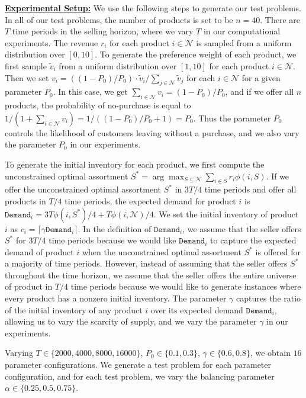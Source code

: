 \documentclass[mnsc,non-blindrev]{informs3}
\theoremstyle{definition}
\begin{document}
\begin{appendices}{\Large{}}
{\noindent\underline{\bf Experimental Setup:} We use the following steps to generate our test problems. In all of our test problems, the number of products is set to be $n=40$. There are $T$ time periods in the selling horizon, where we vary $T$ in our computational experiments. The revenue $r_i$ for each product $i\in\mathcal{N}$ is sampled from a uniform distribution over $[0,10]$. To generate the preference weight of each product, we first sample $\tilde{v}_i$ from a uniform distribution over $[1,10]$ for each product $i\in\mathcal{N}$. Then we set $v_i=({(1-P_0)}/{P_0})\cdot\tilde{v}_i/\sum_{j\in\mathcal{N}}\tilde{v}_j$ for each $i\in\mathcal{N}$ for a given parameter $P_0$. In this case, we get $\sum_{i\in\mathcal{N}}v_i={(1-P_0)}/{P_0}$, and if we offer all $n$ products, the probability of no-purchase is equal to $1/(1+\sum_{i\in\mathcal{N}}v_i)=1/({(1-P_0)}/{P_0}+1)=P_0$. Thus the parameter $P_0$ controls the likelihood of customers leaving without a purchase, and we also vary the parameter $P_0$ in our experiments.

To generate the initial inventory for each product, we first compute the unconstrained optimal assortment $S^*=\arg\max_{S\subseteq\mathcal{N}}\sum_{i\in S}r_i\phi(i,S)$. If we offer the unconstrained optimal assortment $S^*$ in $3T/4$ time periods and offer all products in $T/4$ time periods, the expected demand for product $i$ is $\texttt{Demand}_i=3T\phi(i,S^*)/4+T\phi(i,\mathcal{N})/4$. We set the initial inventory of product $i$ as $c_i=\lceil\gamma\texttt{Demand}_i\rceil$. In the definition of $\texttt{Demand}_i$, we assume that the seller offers $S^*$ for $3T/4$ time periods because we would like $\texttt{Demand}_i$ to capture the expected demand of product $i$ when the unconstrained optimal assortment $S^*$ is offered for a majority of time periods. However, instead of assuming that the seller offers $S^*$ throughout the time horizon, we assume that the seller offers the entire universe of product in $T/4$ time periods because we would like to generate instances where every product has a nonzero initial inventory. The parameter $\gamma$ captures the ratio of the initial inventory of any product $i$ over its expected demand $\texttt{Demand}_i$, allowing us to vary the scarcity of supply, and we vary the parameter $\gamma$ in our experiments.

Varying $T\in\{2000,4000,8000,16000\}$, $P_0\in\{0.1,0.3\}$, $\gamma\in\{0.6,0.8\}$, we obtain $16$ parameter configurations. We generate a test problem for each parameter configuration, and for each test problem, we vary the balancing parameter $\alpha\in\{0.25,0.5,0.75\}$.

}
\end{appendices}
\end{document}
